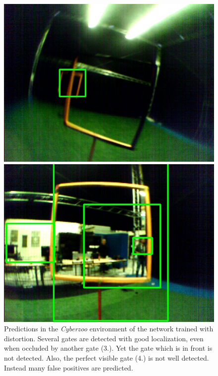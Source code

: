 \begin{figure}[hbtp]
\begin{minipage}{0.24\textwidth}
	\includegraphics[width=\textwidth]{fig/examples/cyberzoo_notnice1.jpg}
\end{minipage}
\begin{minipage}{0.24\textwidth}
	\includegraphics[width=\textwidth]{fig/examples/cyberzoo_notnice2.jpg}
\end{minipage}
\caption{Predictions in the \textit{Cyberzoo} environment of the network trained with distortion. Several gates are detected with good localization, even when occluded by another gate (3.). Yet the gate which is in front is not detected. Also, the perfect visible gate (4.) is not well detected. Instead many false positives are predicted.}
\label{fig:example_cyberzoo}
\begin{minipage}{0.24\textwidth}

\end{minipage}
\end{figure}
